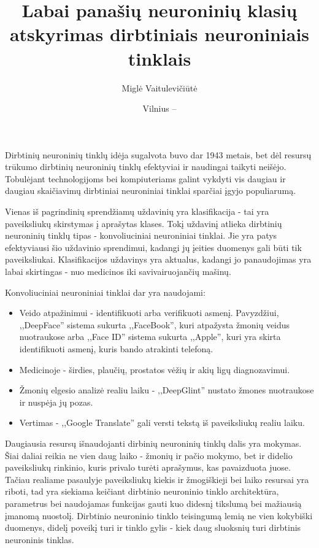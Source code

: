 \documentclass{VUMIFPSkursinis}
\title{Labai panašių neuroninių klasių atskyrimas dirbtiniais neuroniniais tinklais}
\author{Miglė Vaitulevičiūtė}
\date{Vilnius – \the\year}
\begin{document}
	
\maketitle
\cleardoublepage{}
\setcounter{page}{2}

\tableofcontents

Dirbtinių neuroninių tinklų idėja sugalvota buvo dar 1943 metais, bet dėl resursų trūkumo dirbtinių neuroninių tinklų efektyviai ir naudingai taikyti neišėjo. 
Tobulėjant technologijoms bei kompiuteriams galint vykdyti vis daugiau ir daugiau skaičiavimų dirbtiniai neuroniniai tinklai sparčiai įgyjo populiarumą.

Vienas iš pagrindinių sprendžiamų uždavinių yra klasifikacija - tai yra paveiksliukų skirstymas į aprašytas klases. Tokį uždavinį atlieka dirbtinių neuroninių 
tinklų tipas - konvoliuciniai neuroniniai tinklai. Jie yra patys efektyviausi šio uždavinio sprendimui, kadangi jų įeities duomenys gali būti tik paveiksliukai.
Klasifikacijos uždavinys yra aktualus, kadangi jo panaudojimas yra labai skirtingas - nuo medicinos iki savivairuojančių mašinų.

Konvoliuciniai neuroniniai tinklai dar yra naudojami:
\begin{itemize}
\item Veido atpažinimui - identifikuoti arba verifikuoti asmenį. Pavyzdžiui, ,,DeepFace'' sistema sukurta ,,FaceBook'', kuri atpažysta žmonių veidus nuotraukose 
arba ,,Face ID'' sistema sukurta ,,Apple'', kuri yra skirta identifikuoti asmenį, kuris bando atrakinti telefoną. 
\item Medicinoje - širdies, plaučių, prostatos vėžių ir akių ligų diagnozavimui.
\item Žmonių elgesio analizė realiu laiku - ,,DeepGlint'' nustato žmones nuotraukose ir nuspėja jų pozas.
\item Vertimas - ,,Google Translate'' gali versti tekstą iš paveiksliukų realiu laiku.
\end{itemize}

Daugiausia resursų išnaudojanti dirbinių neuroninių tinklų dalis yra mokymas. Šiai daliai reikia ne vien daug laiko - žmonių ir pačio mokymo, bet ir didelio 
paveiksliukų rinkinio, kuris privalo turėti aprašymus, kas pavaizduota juose. Tačiau realiame pasaulyje paveiksliukų kiekis ir žmogiškieji bei laiko resursai yra riboti, 
tad yra siekiama keičiant dirbtinio neuroninio tinklo architektūra, parametrus bei naudojamas funkcijas gauti kuo didesnį tikslumą bei mažiausią įmanomą nuostolį. 
Dirbtinio neuroninio tinklo teisingumą lemią ne vien kokybiški duomenys, didelį poveikį turi ir tinklo gylis - kiek daug sluoksnių turi dirbtinis neuroninis 
tinklas. 
\end{document}
